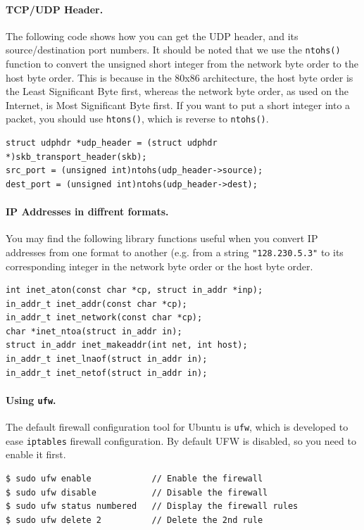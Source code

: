 \paragraph{TCP/UDP Header.}
The following code shows how you can get the UDP header, and its 
source/destination port numbers. It should be noted that we 
use the {\tt ntohs()} function to convert the unsigned short integer 
from the network byte order to the host byte order. This is because
in the 80x86 architecture, the host byte order is the Least Significant Byte first, 
whereas the network byte order, as used on the Internet, is Most Significant Byte
first. If  you want to put a short integer into a packet, 
you should use {\tt htons()}, which is reverse to {\tt ntohs()}. 
\begin{Verbatim}[frame=single]
struct udphdr *udp_header = (struct udphdr *)skb_transport_header(skb);  
src_port = (unsigned int)ntohs(udp_header->source);        
dest_port = (unsigned int)ntohs(udp_header->dest);    
\end{Verbatim}


\paragraph{IP Addresses in diffrent formats.}
You may find the following library functions useful when you convert
IP addresses from one format to another (e.g. from a string {\tt "128.230.5.3"}
to its corresponding integer in the network byte order or the host byte order.
\begin{Verbatim}[frame=single]
int inet_aton(const char *cp, struct in_addr *inp);
in_addr_t inet_addr(const char *cp);
in_addr_t inet_network(const char *cp);
char *inet_ntoa(struct in_addr in);
struct in_addr inet_makeaddr(int net, int host);
in_addr_t inet_lnaof(struct in_addr in);
in_addr_t inet_netof(struct in_addr in);
\end{Verbatim}


\paragraph{Using {\tt ufw}.}
The default firewall configuration tool for Ubuntu is {\tt ufw}, 
which is developed to ease {\tt iptables} firewall configuration. 
By default UFW is disabled, so you need to enable it first.
\begin{Verbatim}[frame=single]
$ sudo ufw enable            // Enable the firewall
$ sudo ufw disable           // Disable the firewall
$ sudo ufw status numbered   // Display the firewall rules
$ sudo ufw delete 2          // Delete the 2nd rule
\end{Verbatim}

